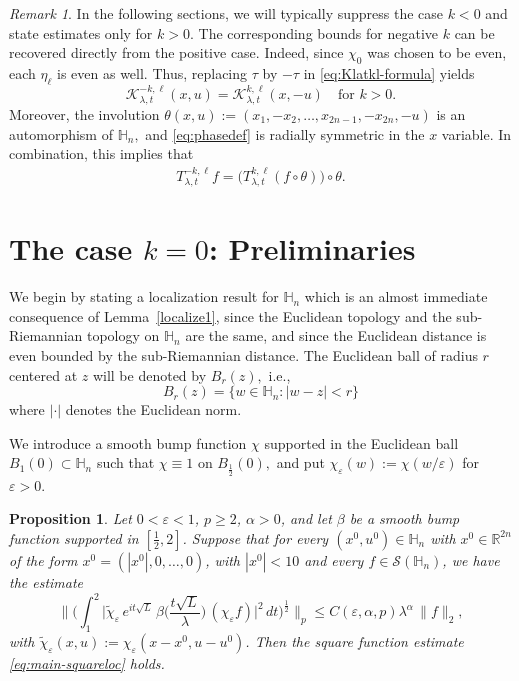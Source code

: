 \documentclass[leqno]{amsart}
\newtheorem{proposition}[theorem]{Proposition}
\theoremstyle{definition}
\theoremstyle{remark}
\newtheorem{remark}[theorem]{Remark}
\numberwithin{equation}{section}
\newcommand{\eps}{\varepsilon}
\newcommand\la{{\lambda}}
\newcommand\bbH{{\mathbb {H}}}
\newcommand\bbR{{\mathbb {R}}}
\newcommand\sK{{\mathscr {K}}}
\begin{document}
  
\begin{remark}\label{rem:k-negative}
In the following sections, we will typically suppress the case $k<0$ and state estimates only for $k>0$. The corresponding bounds for negative $k$ can be recovered directly from the positive case. Indeed, since $\chi_0$ was chosen to be even, each $\eta_\ell$ is even as well. Thus, replacing $\tau$ by $-\tau$ in \eqref{eq:Klatkl-formula} yields
\[
\sK_{\lambda,t}^{-k,\ell}(x, u) = \sK_{\lambda,t}^{k,\ell}(x, -u) \quad \text{for } k>0. 
\]
Moreover, the involution $\theta(x,u):=(x_1,-x_2,\dots,x_{2n-1},-x_{2n},-u)$ is an automorphism of $\mathbb H_n,$ and   \eqref{eq:phasedef} is radially symmetric in the $x$ variable.  In combination, this implies that 
\begin{align*}
T^{-k,\ell}_{\la,t} f  = \big( T^{k,\ell}_{\la,t}  (f\circ \theta)\big) \circ \theta.
\end{align*}
\end{remark}

\section{The case $k=0$: Preliminaries}\label{sec:k=0-preliminaries}

We begin by stating a localization result for $\bbH_n$ which is an almost immediate consequence of Lemma~\ref{localize1}, since the Euclidean topology and the sub-Riemannian topology  on $\bbH_n$ are the same, and since the Euclidean distance is even bounded by the sub-Riemannian distance. The Euclidean ball of radius $r$ centered at $z$ will be denoted by 
$B_r(z),$ i.e.,
\[
B_r(z)=\{w\in \bbH_n:|w-z|<r\}
\]
where $|\cdot|$ denotes the Euclidean norm.

We introduce a smooth bump function $\chi$ supported in the Euclidean ball $B_1(0)\subset \bbH_n$ such that $\chi\equiv 1$ on $B_{\frac{1}{2}}(0),$ and put $\chi_\eps(w):=\chi(w/\eps)$ for  $\eps>0.$ 

\begin{proposition} \label{prop:localization}
Let $0 < \eps < 1$, $p \geq 2$, $\alpha > 0$, and let $\beta$ be a smooth bump function supported in $[\frac12,2]$.  Suppose that for every  $(x^0,u^0) \in \bbH_n$ with $x^0 \in \bbR^{2n}$ of the form $x^0=(|x^0|,0,\ldots,0)$, with $|x^0| < 10$ and every $f \in \mathcal{S}(\bbH_n)$, we have the estimate
\begin{equation}\label{eq:main-square-L2}
\Big\| \Big( \int_1^2 \Big| \tilde \chi_{\varepsilon} \, e^{it\sqrt{L}} \, \beta\Big( \frac{t\sqrt{L}}{\lambda} \Big) \, ( \chi_{\varepsilon}f) \Big|^2 \, dt \Big)^{\frac{1}{2}} \Big\|_p
\le C(\eps, \alpha,p) \lambda^\alpha \, \|f\|_2,
\end{equation}
with $\tilde \chi_\eps(x,u):=\chi_\eps(x-x^0,u-u^0)$.  Then the square function estimate \eqref{eq:main-squareloc} holds.  
\end{proposition}
\end{document}
